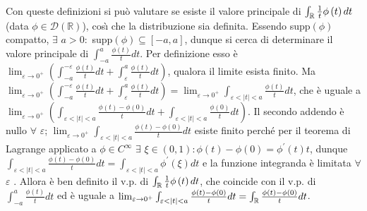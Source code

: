 \documentclass{article}
\begin{document}
Con queste definizioni si pu\`{o} valutare se esiste il valore principale di 
$\int_{%
\mathbb{R}
}\frac{1}{t}\phi \left( t\right) dt$ (data $\phi \in \mathcal{D}\left( 
\mathbb{R}
\right) $), cos\`{\i} che la distribuzione sia definita. Essendo supp$\left(
\phi \right) $ compatto, $\exists $ $a>0:$ supp$\left( \phi \right)
\subseteq \left[ -a,a\right] $, dunque si cerca di determinare il valore
principale di $\int_{-a}^{a}\frac{\phi \left( t\right) }{t}dt$. Per
definizione esso \`{e} $\lim_{\varepsilon \rightarrow 0^{+}}\left(
\int_{-a}^{-\varepsilon }\frac{\phi \left( t\right) }{t}dt+\int_{\varepsilon
}^{a}\frac{\phi \left( t\right) }{t}dt\right) $, qualora il limite esista
finito. Ma $\lim_{\varepsilon \rightarrow 0^{+}}\left(
\int_{-a}^{-\varepsilon }\frac{\phi \left( t\right) }{t}dt+\int_{\varepsilon
}^{a}\frac{\phi \left( t\right) }{t}dt\right) =\lim_{\varepsilon \rightarrow
0^{+}}\int_{\varepsilon <\left\vert t\right\vert <a}\frac{\phi \left(
t\right) }{t}dt$, che \`{e} uguale a $\lim_{\varepsilon \rightarrow
0^{+}}\left( \int_{\varepsilon <\left\vert t\right\vert <a}\frac{\phi \left(
t\right) -\phi \left( 0\right) }{t}dt+\int_{\varepsilon <\left\vert
t\right\vert <a}\frac{\phi \left( 0\right) }{t}dt\right) $. Il secondo
addendo \`{e} nullo $\forall $ $\varepsilon $; $\lim_{\varepsilon
\rightarrow 0^{+}}\int_{\varepsilon <\left\vert t\right\vert <a}\frac{\phi
\left( t\right) -\phi \left( 0\right) }{t}dt$ esiste finito perch\'{e} per
il teorema di Lagrange applicato a $\phi \in C^{\infty }$ $\exists $ $\xi
\in \left( 0,1\right) :\phi \left( t\right) -\phi \left( 0\right) =\phi
^{\prime }\left( t\right) t$, dunque $\int_{\varepsilon <\left\vert
t\right\vert <a}\frac{\phi \left( t\right) -\phi \left( 0\right) }{t}%
dt=\int_{\varepsilon <\left\vert t\right\vert <a}\phi ^{\prime }\left( \xi
\right) dt$ e la funzione integranda \`{e} limitata $\forall $ $\varepsilon $%
. Allora \`{e} ben definito il v.p. di $\int_{%
\mathbb{R}
}\frac{1}{t}\phi \left( t\right) dt$, che coincide con il v.p. di $%
\int_{-a}^{a}\frac{\phi \left( t\right) }{t}dt$ ed \`{e} uguale a $%
\lim_{\varepsilon \rightarrow 0^{+}}\int_{\varepsilon <\left\vert
t\right\vert <a}\frac{\phi \left( t\right) -\phi \left( 0\right) }{t}%
dt=\int_{%
\mathbb{R}
}\frac{\phi \left( t\right) -\phi \left( 0\right) }{t}dt$.
\end{document}
